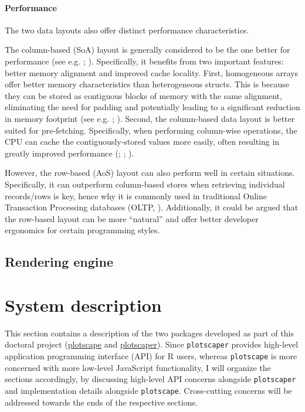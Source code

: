 \documentclass[
]{book}
\theoremstyle{definition}
\theoremstyle{definition}
\theoremstyle{definition}
\theoremstyle{definition}
\theoremstyle{remark}
\begin{document}
\subsubsection{Performance}\label{performance}

The two data layouts also offer distinct performance characteristics.

The column-based (SoA) layout is generally considered to be the one better for performance (see e.g. ; ). Specifically, it benefits from two important features: better memory alignment and improved cache locality. First, homogeneous arrays offer better memory characteristics than heterogeneous structs. This is because they can be stored as contiguous blocks of memory with the same alignment, eliminating the need for padding and potentially leading to a significant reduction in memory footprint (see e.g. ; ). Second, the column-based data layout is better suited for pre-fetching. Specifically, when performing column-wise operations, the CPU can cache the contiguously-stored values more easily, often resulting in greatly improved performance (; ; ).

However, the row-based (AoS) layout can also perform well in certain situations. Specifically, it can outperform column-based stores when retrieving individual records/rows is key, hence why it is commonly used in traditional Online Transaction Processing databases (OLTP, ). Additionally, it could be argued that the row-based layout can be more ``natural'' and offer better developer ergonomics for certain programming styles.

\section{Rendering engine}\label{rendering-engine}

\chapter{System description}\label{system}

This section contains a description of the two packages developed as part of this doctoral project (\href{https://github.com/bartonicek/plotscape}{plotscape} and \href{https://github.com/bartonicek/plotscaper}{plotscaper}). Since \texttt{plotscaper} provides high-level application programming interface (API) for R users, whereas \texttt{plotscape} is more concerned with more low-level JavaScript functionality, I will organize the sections accordingly, by discussing high-level API concerns alongside \texttt{plotscaper} and implementation details alongside \texttt{plotscape}. Cross-cutting concerns will be addressed towards the ends of the respective sections.
\end{document}
